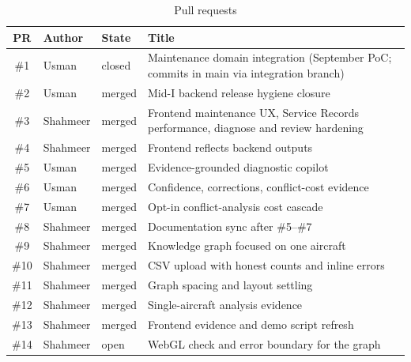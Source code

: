 \begin{table}[H]
\centering
\caption{Pull requests}
\label{tab:prs}
\small
\begin{tabularx}{\textwidth}{@{}c >{\raggedright\arraybackslash}p{} >{\raggedright\arraybackslash}p{} L@{}}
\toprule
PR & Author & State & Title \\
\midrule
\#1 & Usman & closed & Maintenance domain integration (September PoC; commits in main via integration branch) \\
\#2 & Usman & merged & Mid-I backend release hygiene closure \\
\#3 & Shahmeer & merged & Frontend maintenance UX, Service Records performance, diagnose and review hardening \\
\#4 & Shahmeer & merged & Frontend reflects backend outputs \\
\#5 & Usman & merged & Evidence-grounded diagnostic copilot \\
\#6 & Usman & merged & Confidence, corrections, conflict-cost evidence \\
\#7 & Usman & merged & Opt-in conflict-analysis cost cascade \\
\#8 & Shahmeer & merged & Documentation sync after \#5--\#7 \\
\#9 & Shahmeer & merged & Knowledge graph focused on one aircraft \\
\#10 & Shahmeer & merged & CSV upload with honest counts and inline errors \\
\#11 & Shahmeer & merged & Graph spacing and layout settling \\
\#12 & Shahmeer & merged & Single-aircraft analysis evidence \\
\#13 & Shahmeer & merged & Frontend evidence and demo script refresh \\
\#14 & Shahmeer & open & WebGL check and error boundary for the graph \\
\bottomrule
\end{tabularx}
\end{table}
